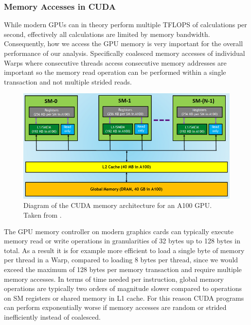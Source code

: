 \subsubsection{Memory Accesses in CUDA}
While modern GPUs can in theory perform multiple TFLOPS of calculations per second, effectively all calculations are limited by memory bandwidth.
Consequently, how we access the GPU memory is very important for the overall performance of our analysis. Specifically coalesced memory accesses of individual Warps where consecutive threads access consecutive memory addresses are important so the memory read operation can be performed within a single transaction and not multiple strided reads.
\begin{figure}
    \centering
    \includegraphics[width=.7\textwidth]{img/cuda.png}
    \caption{Diagram of the CUDA memory architecture for an A100 GPU.\\Taken from \cite{cudarefresher}.}
    \label{fig:cuda-arch}
\end{figure}
The GPU memory controller on modern graphics cards can typically execute memory read or write operations in granularities of 32 bytes up to 128 bytes in total.
As a result it is for example more efficient to load a single byte of memory per thread in a Warp, compared to loading 8 bytes per thread, since we would exceed the maximum of 128 bytes per memory transaction and require multiple memory accesses.
In terms of time needed per instruction, global memory operations are typically two orders of magnitude slower compared to operations on SM registers or shared memory in L1 cache. For this reason CUDA programs can perform exponentially worse if memory accesses are random or strided inefficiently instead of coalesced.

